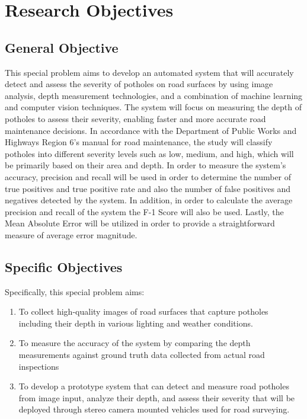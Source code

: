 \section{Research Objectives}
\label{sec:researchobjectives}

\subsection{General Objective}
\label{sec:generalobjective}

This special problem aims to develop an automated system that will accurately detect and assess the severity of potholes on road surfaces by using image analysis, depth measurement technologies, and a combination of machine learning and computer vision techniques. The system will focus on measuring the depth of potholes to assess their severity, enabling faster and more accurate road maintenance decisions. In accordance with the Department of Public Works and Highways Region 6’s manual for road maintenance, the study will classify potholes into different severity levels such as low, medium, and high, which will be primarily based on their area and depth. In order to measure the system's accuracy, precision and recall will be used in order to determine the number of true positives and true positive rate and also the number of false positives and negatives detected by the system. In addition, in order to calculate the average precision and recall of the system the F-1 Score will also be used. Lastly, the Mean Absolute Error will be utilized in order to provide a straightforward measure of average error magnitude.



\subsection{Specific Objectives}
\label{sec:specificobjectives}

Specifically, this special problem aims:
\begin{enumerate}
	\item To collect high-quality images of road surfaces that capture potholes including their depth in various lighting and weather conditions.
	\item To measure the accuracy of the system by comparing the depth measurements against ground truth data collected from actual road inspections
	\item To develop a prototype system that can detect and measure road potholes from image input, analyze their depth, and assess their severity that will be deployed through stereo camera mounted vehicles used for road surveying.
\end{enumerate}

